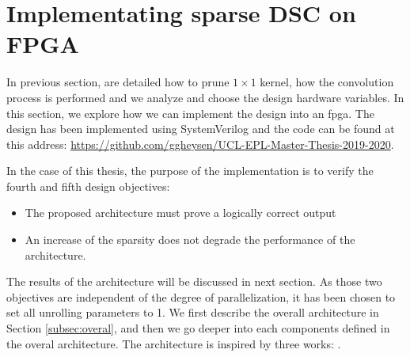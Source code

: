 \section{Implementating sparse DSC on FPGA} \label{sec:implementation}
In previous section, are detailed how to prune $1 \times 1$ kernel, how the convolution process is performed and we analyze and choose the design hardware variables. In this section, we explore how we can implement the design into an \acrshort{fpga}. The design has been implemented using SystemVerilog and the code can be found at this address: \url{https://github.com/ggheysen/UCL-EPL-Master-Thesis-2019-2020}.

In the case of this thesis, the purpose of the implementation is to verify the fourth and fifth design objectives:
%
\begin{itemize}
    \item The proposed architecture must prove a logically correct output
    \item An increase of the sparsity does not degrade the performance of the architecture.
\end{itemize}
%
The results of the architecture will be discussed in next section. As those two objectives are independent of the degree of parallelization, it has been chosen to set all unrolling parameters to 1. We first describe the overall architecture in Section \ref{subsec:overal}, and then we go deeper into each components defined in the overal architecture. The architecture is inspired by three works: \textcite{zhu_efficient_2020, kang_accelerator-aware_2020, bai_cnn_2018}.
%
